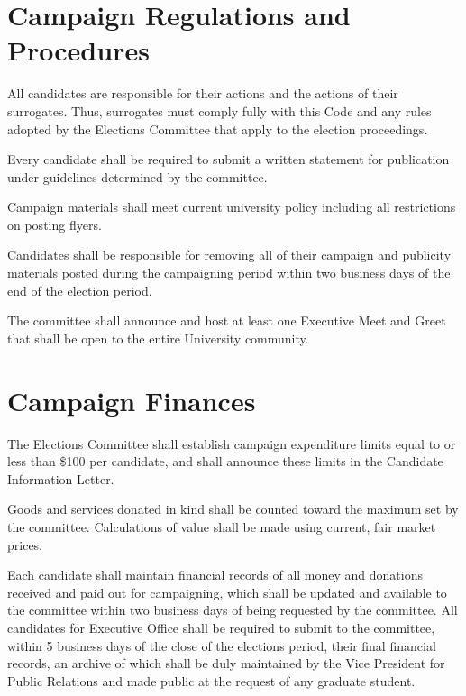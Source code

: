 \section{Campaign Regulations and Procedures}
\begin{bylaws-number}
  \item All candidates are responsible for their actions and the actions of their surrogates. Thus, surrogates must comply fully with this Code and any rules adopted by the Elections Committee that apply to the election proceedings.
  \item Every candidate shall be required to submit a written statement for publication under guidelines determined by the committee.
  \item Campaign materials shall meet current university policy including all restrictions on posting flyers.
  \item Candidates shall be responsible for removing all of their campaign and publicity materials posted during the campaigning period within two business days of the end of the election period.
  \item The committee shall announce and host at least one Executive Meet and Greet that shall be open to the entire University community.
\end{bylaws-number}

\section{Campaign Finances}
\begin{bylaws-number}
  \item The Elections Committee shall establish campaign expenditure limits equal to or less than \$100 per candidate, and shall announce these limits in the Candidate Information Letter.
  \item Goods and services donated in kind shall be counted toward the maximum set by the committee. Calculations of value shall be made using current, fair market prices.
  \item Each candidate shall maintain financial records of all money and donations received and paid out for campaigning, which shall be updated and available to the committee within two business days of being requested by the committee. All candidates for Executive Office shall be required to submit to the committee, within 5 business days of the close of the elections period, their final financial records, an archive of which shall be duly maintained by the Vice President for Public Relations and made public at the request of any graduate student.
\end{bylaws-number}

